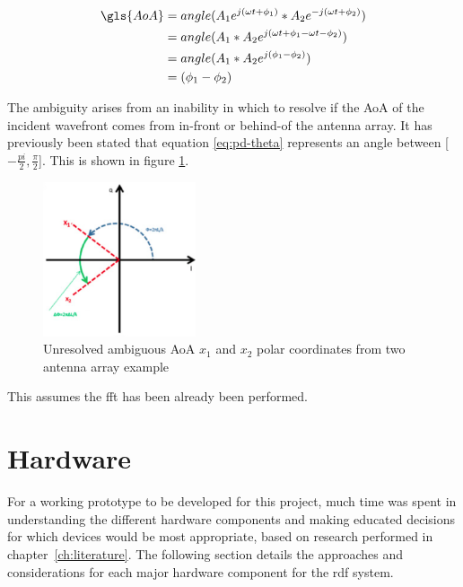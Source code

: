 \documentclass[class=report,11pt,crop=false]{standalone}
\begin{document}
\begin{equation}
    \begin{split}
        \gls{AoA} & = angle(A_1 e^{j(\omega t + \phi_1)} * A_2e^{-j(\omega t + \phi_2)}) \\
        & = angle(A_1 * A_2  e^{j(\omega t + \phi_1 - \omega t - \phi_2)}) \\
        & = angle(A_1 * A_2  e^{j(\phi_1 - \phi_2)}) \\
        & = (\phi_1 - \phi_2)
\end{split}
\end{equation}

The ambiguity arises from an inability in which to resolve if the \gls{AoA} of the incident wavefront comes from in-front or behind-of the antenna array. It has previously been stated that equation \ref{eq:pd-theta} represents an angle between [$-\frac{pi}{2}, \frac{\pi}{2}$]. This is shown in figure \ref{fig:ambiguity}.

\begin{figure}[h]
    \centering
    \includegraphics[width=0.4\textwidth]{Images/diagrams/ambiguity.png}
    \caption{Unresolved ambiguous AoA $x_1$ and $x_2$ polar coordinates from two antenna array example}
    \label{fig:ambiguity}
\end{figure}

This assumes the \gls{fft} has been already been performed. 


\section{Hardware}
For a working prototype to be developed for this project, much time was spent in understanding the different hardware components and making educated decisions for which devices would be most appropriate, based on research performed in chapter~\ref{ch:literature}. The following section details the approaches and considerations for each major hardware component for the \gls{rdf} system. 
\end{document}
